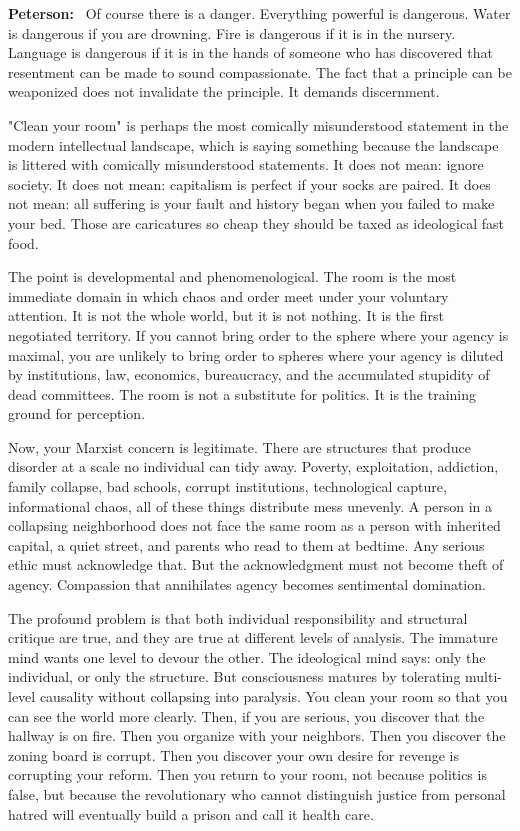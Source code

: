 \documentclass[a4paper,11pt]{article}
\newenvironment{answer}{\par\noindent\color{black}\textbf{Peterson:}\ }{\par}
\begin{document}
\begin{answer}
Of course there is a danger. Everything powerful is dangerous. Water is dangerous if you are drowning. Fire is dangerous if it is in the nursery. Language is dangerous if it is in the hands of someone who has discovered that resentment can be made to sound compassionate. The fact that a principle can be weaponized does not invalidate the principle. It demands discernment.

"Clean your room" is perhaps the most comically misunderstood statement in the modern intellectual landscape, which is saying something because the landscape is littered with comically misunderstood statements. It does not mean: ignore society. It does not mean: capitalism is perfect if your socks are paired. It does not mean: all suffering is your fault and history began when you failed to make your bed. Those are caricatures so cheap they should be taxed as ideological fast food.

The point is developmental and phenomenological. The room is the most immediate domain in which chaos and order meet under your voluntary attention. It is not the whole world, but it is not nothing. It is the first negotiated territory. If you cannot bring order to the sphere where your agency is maximal, you are unlikely to bring order to spheres where your agency is diluted by institutions, law, economics, bureaucracy, and the accumulated stupidity of dead committees. The room is not a substitute for politics. It is the training ground for perception.

Now, your Marxist concern is legitimate. There are structures that produce disorder at a scale no individual can tidy away. Poverty, exploitation, addiction, family collapse, bad schools, corrupt institutions, technological capture, informational chaos, all of these things distribute mess unevenly. A person in a collapsing neighborhood does not face the same room as a person with inherited capital, a quiet street, and parents who read to them at bedtime. Any serious ethic must acknowledge that. But the acknowledgment must not become theft of agency. Compassion that annihilates agency becomes sentimental domination.

The profound problem is that both individual responsibility and structural critique are true, and they are true at different levels of analysis. The immature mind wants one level to devour the other. The ideological mind says: only the individual, or only the structure. But consciousness matures by tolerating multi-level causality without collapsing into paralysis. You clean your room so that you can see the world more clearly. Then, if you are serious, you discover that the hallway is on fire. Then you organize with your neighbors. Then you discover the zoning board is corrupt. Then you discover your own desire for revenge is corrupting your reform. Then you return to your room, not because politics is false, but because the revolutionary who cannot distinguish justice from personal hatred will eventually build a prison and call it health care.
\end{answer}
\end{document}
